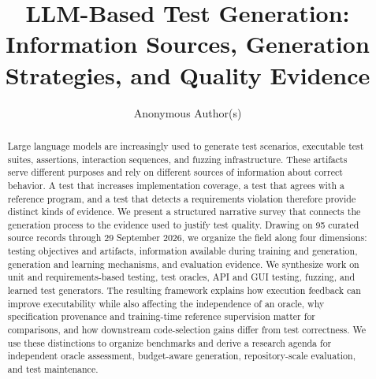 \documentclass[acmsmall,screen,review,anonymous]{acmart}
\title[LLM-Based Test Generation]{LLM-Based Test Generation: Information Sources, Generation Strategies, and Quality Evidence}
\author{Anonymous Author(s)}
\begin{document}
\begin{abstract}
Large language models are increasingly used to generate test scenarios, executable test suites, assertions, interaction sequences, and fuzzing infrastructure. These artifacts serve different purposes and rely on different sources of information about correct behavior. A test that increases implementation coverage, a test that agrees with a reference program, and a test that detects a requirements violation therefore provide distinct kinds of evidence. We present a structured narrative survey that connects the generation process to the evidence used to justify test quality. Drawing on 95 curated source records through 29 September 2026, we organize the field along four dimensions: testing objectives and artifacts, information available during training and generation, generation and learning mechanisms, and evaluation evidence. We synthesize work on unit and requirements-based testing, test oracles, API and GUI testing, fuzzing, and learned test generators. The resulting framework explains how execution feedback can improve executability while also affecting the independence of an oracle, why specification provenance and training-time reference supervision matter for comparisons, and how downstream code-selection gains differ from test correctness. We use these distinctions to organize benchmarks and derive a research agenda for independent oracle assessment, budget-aware generation, repository-scale evaluation, and test maintenance.
\end{abstract}
\maketitle









\clearpage


\end{document}
